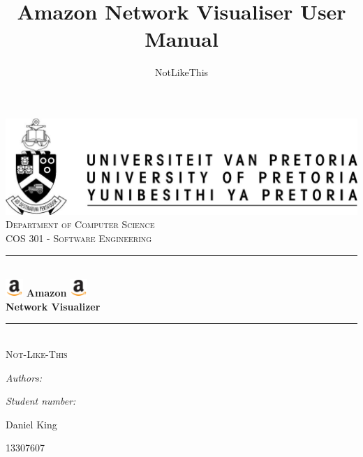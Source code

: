 \documentclass[hidelinks,a4paper,12pt]{article}
\author{NotLikeThis}
\title{Amazon Network Visualiser User Manual}
\newcommand{\HRule}{\rule{\linewidth}{0.5mm}}
\begin{document}
\setlength{\parskip}{6pt}

\begin{titlepage}

\begin{center}
\includegraphics[width=1\textwidth]{./images/up-logo.jpg}\\[0.4cm]    
\textsc{\LARGE Department of Computer Science}\\[1.5cm]
\textsc{\Large COS 301 - Software Engineering}\\[0.5cm]
\HRule \\[0.4cm]
\includegraphics[width=0.05\textwidth]{./images/logo.jpg} 
{ \huge \bfseries Amazon}
\includegraphics[width=0.05\textwidth]{./images/logo.jpg}\\[0.4cm] 
{ \huge \bfseries Network Visualizer}\\[0.4cm]
\HRule \\[0.4cm]
\textsc{\Large Not-Like-This}\\[0.5cm]
\begin{minipage}{0.4\textwidth}
\begin{flushleft} \large
\emph{Authors:}
\end{flushleft}
\end{minipage}
\begin{minipage}{0.4\textwidth}
\begin{flushright} \large
\emph{Student number:}
\end{flushright}
\end{minipage}

\begin{minipage}{0.4\textwidth}
\begin{flushleft} \large
Daniel King
\end{flushleft}
\end{minipage}
\begin{minipage}{0.4\textwidth}
\begin{flushright} \large
\emph{}
13307607
\end{flushright}
\end{minipage}


\end{center}
\end{titlepage}
\end{document}
